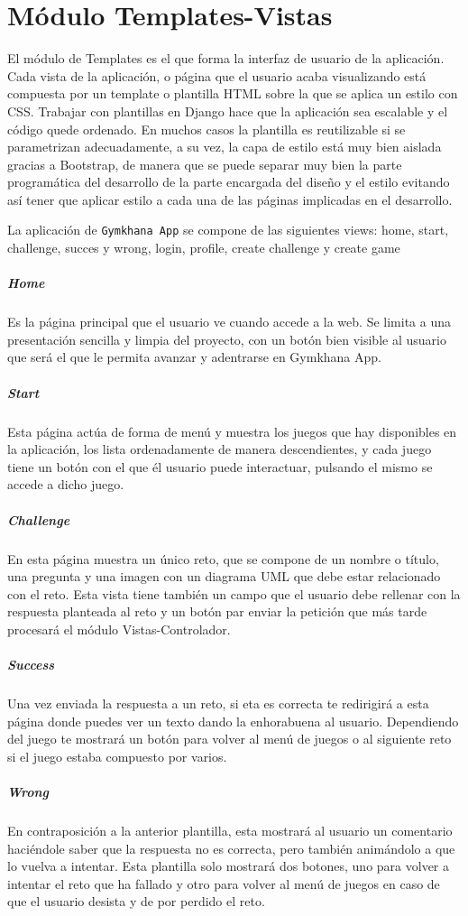 \documentclass[a4paper, 12pt]{book}
\begin{document}
\section{Módulo Templates-Vistas}
El módulo de Templates es el que forma la interfaz de usuario de la aplicación. Cada vista de la aplicación, o página que el usuario acaba visualizando está compuesta por un template o plantilla HTML sobre la que se aplica un estilo con CSS. Trabajar con plantillas en Django hace que la aplicación sea escalable y el código quede ordenado. En muchos casos la plantilla es reutilizable si se parametrizan adecuadamente, a su vez, la capa de estilo está muy bien aislada gracias a Bootstrap, de manera que se puede separar muy bien la parte programática del desarrollo de la parte encargada del diseño y el estilo evitando así tener que aplicar estilo a cada una de las páginas implicadas en el desarrollo. 

La aplicación de \texttt{Gymkhana App} se compone de las siguientes views: home, start, challenge, succes y wrong, login, profile, create challenge y create game
\subparagraph{Home}
Es la página principal que el usuario ve cuando accede a la web. Se limita a una presentación sencilla y limpia del proyecto, con un botón bien visible al usuario que será el que le permita avanzar y adentrarse en Gymkhana App. 
\subparagraph{Start}
Esta página actúa de forma de menú y muestra los juegos que hay disponibles en la aplicación, los lista ordenadamente de manera descendientes, y cada juego tiene un botón con el que él usuario puede interactuar, pulsando el mismo se accede a dicho juego.  
\subparagraph{Challenge} 
En esta página muestra un único reto, que se compone de un nombre o título, una pregunta y una imagen con un diagrama UML que debe estar relacionado con el reto. Esta vista tiene también un campo que el usuario debe rellenar con la respuesta planteada al reto y un botón par enviar la petición que más tarde procesará el módulo Vistas-Controlador.
\subparagraph{Success}
Una vez enviada la respuesta a un reto, si eta es correcta te redirigirá a esta página donde puedes ver un texto dando la enhorabuena al usuario. Dependiendo del juego te mostrará un botón para volver al menú de juegos o al siguiente reto si el juego estaba compuesto por varios. 
\subparagraph{Wrong}
En contraposición a la anterior plantilla, esta mostrará al usuario un comentario haciéndole saber que la respuesta no es correcta, pero también animándolo a que lo vuelva a intentar. Esta plantilla solo mostrará dos botones, uno para volver a intentar el reto que ha fallado y otro para volver al menú de juegos en caso de que el usuario desista y de por perdido el reto. 
\end{document}
